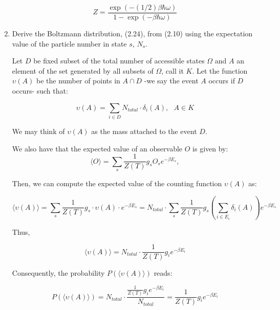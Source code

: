 \documentclass[12pt,letterpaper]{report}
\begin{document}
\begin{enumerate}
		\begin{equation*}
		Z =  \dfrac{\exp\left( -(1/2)\beta \hbar \omega\right) }{ 1- \exp\left( - \beta \hbar \omega \right)   }
		\end{equation*}
		
		\item Derive the Boltzmann distribution, (2.24), from (2.10) using the expectation value of the particle number in state $s$, $N_{s}$.
		
		Let $D$ be fixed subset of the total number of accessible states $\Omega$ and $A$ an element of the set generated by all subsets of $\Omega$, call it $K$. Let the function $\upsilon(A)$ be the number of points in $A\cap D$ -we say the event $A$ occurs if $D$ occurs- such that: 
			
		$$
		\upsilon(A) = \sum_{i \in D} N_{total} \cdot \delta_{i}(A), \text{ } A \in K
		$$
		
		We may think of $\upsilon(A)$ as the mass attached to the event $D$.
		
		We also have that the expected value of an observable $O$ is given by: 
		$$  
		 \langle O \rangle= \sum_s \frac{1}{Z(T)}g_s O_s e^{- \beta E_s},
		$$
		
		Then, we can compute the expected value of the counting function $\upsilon(A)$ as:
		
		$$  
		\langle \upsilon(A) \rangle= \sum_s \frac{1}{Z(T)}g_s \cdot \upsilon(A) \cdot e^{- \beta E_s}= 
		 N_{total} \cdot \sum_s \frac{1}{Z(T)}g_s \left( \sum_{i \in E_i} \delta_{i}(A) \right)e^{- \beta E_s}
		$$
		
		Thus, 
		
		$$  
		\langle \upsilon(A) \rangle=
		N_{total}\cdot \frac{1}{Z(T)}g_i e^{- \beta E_i}
		$$

		Consequently, the probability $P(\langle \upsilon(A) \rangle)$ reads: 
		
		$$
		P(\langle \upsilon(A) \rangle)  = 
		N_{total} \cdot \dfrac{\frac{1}{Z(T)}g_i    e^{- \beta E_i}}{N_{total}}
		= 
		\frac{1}{Z(T)}g_i  e^{- \beta E_i}
		$$

	\end{enumerate}
	
\end{document}

